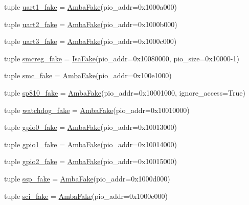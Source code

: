 \begin{DoxyCompactItemize}
\item 
tuple \hyperlink{classRealView_1_1RealViewEB_ae8df5f47228f3c94133173ef497a4203}{uart1\_\-fake} = \hyperlink{classRealView_1_1AmbaFake}{AmbaFake}(pio\_\-addr=0x1000a000)
\item 
tuple \hyperlink{classRealView_1_1RealViewEB_a0c7e8be915fc7946adb67f2522bf26b1}{uart2\_\-fake} = \hyperlink{classRealView_1_1AmbaFake}{AmbaFake}(pio\_\-addr=0x1000b000)
\item 
tuple \hyperlink{classRealView_1_1RealViewEB_ac8f4703047b3e05e27410c2c79b2f043}{uart3\_\-fake} = \hyperlink{classRealView_1_1AmbaFake}{AmbaFake}(pio\_\-addr=0x1000c000)
\item 
tuple \hyperlink{classRealView_1_1RealViewEB_a81ce9ec26608ce51a51be37cbd1dfca3}{smcreg\_\-fake} = \hyperlink{classIsaFake}{IsaFake}(pio\_\-addr=0x10080000, pio\_\-size=0x10000-\/1)
\item 
tuple \hyperlink{classRealView_1_1RealViewEB_ae5f924bae96d172d477be2bfc6df2004}{smc\_\-fake} = \hyperlink{classRealView_1_1AmbaFake}{AmbaFake}(pio\_\-addr=0x100e1000)
\item 
tuple \hyperlink{classRealView_1_1RealViewEB_a42d6450a02aa42b77cd21f39eb6a3fbb}{sp810\_\-fake} = \hyperlink{classRealView_1_1AmbaFake}{AmbaFake}(pio\_\-addr=0x10001000, ignore\_\-access=True)
\item 
tuple \hyperlink{classRealView_1_1RealViewEB_a6dfafd229651b87c734e8433a613a8a4}{watchdog\_\-fake} = \hyperlink{classRealView_1_1AmbaFake}{AmbaFake}(pio\_\-addr=0x10010000)
\item 
tuple \hyperlink{classRealView_1_1RealViewEB_a290572125413a30d7e52e4bdeff0f6fd}{gpio0\_\-fake} = \hyperlink{classRealView_1_1AmbaFake}{AmbaFake}(pio\_\-addr=0x10013000)
\item 
tuple \hyperlink{classRealView_1_1RealViewEB_aa30da97211a9426c3ce02c4e868d7203}{gpio1\_\-fake} = \hyperlink{classRealView_1_1AmbaFake}{AmbaFake}(pio\_\-addr=0x10014000)
\item 
tuple \hyperlink{classRealView_1_1RealViewEB_ad5e65e2358629c72cc90cf5dc3bdb8ab}{gpio2\_\-fake} = \hyperlink{classRealView_1_1AmbaFake}{AmbaFake}(pio\_\-addr=0x10015000)
\item 
tuple \hyperlink{classRealView_1_1RealViewEB_a663792173a35cbb5279a335c3cda0e15}{ssp\_\-fake} = \hyperlink{classRealView_1_1AmbaFake}{AmbaFake}(pio\_\-addr=0x1000d000)
\item 
tuple \hyperlink{classRealView_1_1RealViewEB_a3f48d40a61aee1b51e22944a6926a4c3}{sci\_\-fake} = \hyperlink{classRealView_1_1AmbaFake}{AmbaFake}(pio\_\-addr=0x1000e000)

\end{DoxyCompactItemize}

